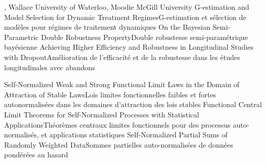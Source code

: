 
{
,  {Wallace}
{University of Waterloo},  {Moodie}
{McGill University}
}
{G-estimation and Model Selection for Dynamic Treatment Regimes}{G-estimation et sélection de modèles pour régimes de traitement dynamiques}
{\bubbleE \enspace \screenE}
{
}
{On the Bayesian Semi-Parametric Double Robustness Property}{Double robustesse semi-paramétrique bayésienne}
{\bubbleE \enspace \screenE}
{
}
{Achieving Higher Efficiency and Robustness in Longitudinal Studies with Dropout}{Amélioration de l’efficacité et de la robustesse dans les études longitudinales avec abandons}
{\bubbleE \enspace \screenE}


{
}
{Self-Normalized Weak and Strong Functional Limit Laws in the Domain of Attraction of Stable Laws}{Lois limites fonctionnelles faibles et fortes autonormalisées dans les domaines d’attraction des lois stables}
{\bubbleE \enspace \screenE}
{
}
{Functional Central Limit Theorems for Self-Normalized Processes with Statistical Applications}{Théorèmes centraux limites fonctionnels pour des processus auto-normalisés, et applications statistiques}
{\bubbleE \enspace \screenE}
{
}
{Self-Normalized Partial Sums of Randomly Weighted Data}{Sommes partielles auto-normalisées de données pondérées au hasard}
{\bubbleE \enspace \screenE}


